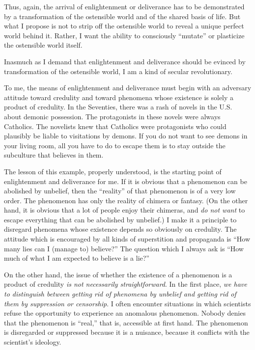 Thus, again, the arrival of enlightenment or deliverance has to be demonstrated 
by a transformation of the ostensible world and of the shared basis of life. But what 
I propose is not to strip off the ostensible world to reveal a unique perfect world 
behind it. Rather, I want the ability to consciously \enquote{mutate} or plasticize the 
ostensible world itself. 

\visbreak

Inasmuch as I demand that enlightenment and deliverance should be evinced 
by transformation of the ostensible world, I am a kind of secular revolutionary. 

To me, the means of enlightenment and deliverance must begin with an adversary 
attitude toward credulity and toward phenomena whose existence is solely a 
product of credulity. In the Seventies, there was a rash of novels in the U.S. about 
demonic possession. The protagonists in these novels were always Catholics. The 
novelists knew that Catholics were protagonists who could plausibly be liable to 
visitations by demons. If you do not want to see demons in your living room, 
all you have to do to escape them is to stay outside the subculture that believes 
in them. 

The lesson of this example, properly understood, is the starting point of enlightenment 
and deliverance for me. If it is obvious that a phenomenon can be 
abolished by unbelief, then the \enquote{reality} of that phenomenon is of a very low order. 
The phenomenon has only the reality of chimera or fantasy. (On the other hand, it 
is obvious that a lot of people enjoy their chimeras, and \textit{do not want} to escape 
everything that can be abolished by unbelief.) I make it a principle to disregard 
phenomena whose existence depends so obviously on credulity. The attitude 
which is encouraged by all kinds of superstition and propaganda is \enquote{How many lies can I (manage to) believe?} The question which I always ask is \enquote{How much of what I am expected to believe is a lie?} 

On the other hand, the issue of whether the existence of a phenomenon is 
a product of credulity \textit{is not necessarily straightforward}. In the first place, 
\textit{we have to distinguish between getting rid of phenomena by unbelief and 
getting rid of them by suppression or censorship}. I often encounter situations 
in which scientists refuse the opportunity to experience an anomalous phenomenon.
Nobody denies that the phenomenon is \enquote{real,} that is, accessible at first hand. The phenomenon is 
disregarded or suppressed because it is a nuisance, because it conflicts with the 
scientist's ideology. 

